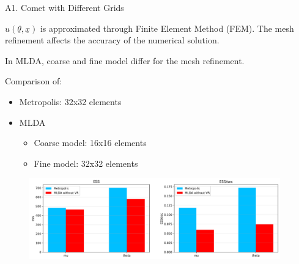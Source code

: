 \documentclass[10pt, a4paper]{beamer}
\begin{document}
	\begin{frame}{A1. Comet with Different Grids}
		
		\vspace{0.5\baselineskip}
		
		$u(\underline{\theta}, \underline{x})$ is approximated through Finite Element Method (FEM). The mesh refinement affects the accuracy of the numerical solution.
		
		\vspace{0.5\baselineskip}
			
		 In MLDA, coarse and fine model differ for the mesh refinement.
		
		\vspace{0.5\baselineskip}

		Comparison of:
		
		\begin{itemize}
			
			\item Metropolis: 32x32 elements
			
			\item MLDA
			
			\begin{itemize}
				
				\item Coarse model: 16x16 elements
				
				\item Fine model: \hspace{2mm} 32x32 elements
				
			\end{itemize}
			
		\end{itemize}
		
		\begin{figure}[H]
			
			\includegraphics[height= 3.5cm, keepaspectratio]{A1_ESS_Comparison}
			
		\end{figure}
		
	\end{frame}
\end{document}
